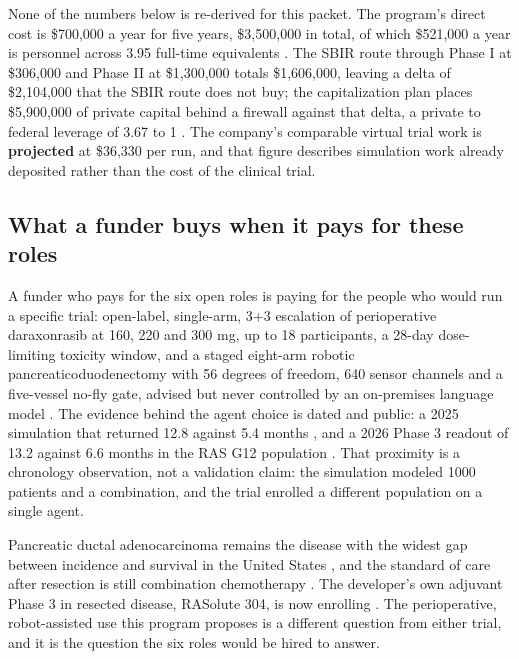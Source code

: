 None of the numbers below is re-derived for this packet. The program's direct
cost is \$700,000 a year for five years, \$3,500,000 in total, of which
\$521,000 a year is personnel across 3.95 full-time equivalents
\cite{movein2026}. The SBIR route through Phase I at \$306,000 and Phase II at
\$1,300,000 totals \$1,606,000, leaving a delta of \$2,104,000 that the SBIR
route does not buy; the capitalization plan places \$5,900,000 of private
capital behind a firewall against that delta, a private to federal leverage of
3.67 to 1 \cite{capitalplan2026}. The company's comparable virtual trial work is
\textbf{projected} at \$36,330 per run, and that figure describes simulation work
already deposited rather than the cost of the clinical trial.

\subsection{What a funder buys when it pays for these roles}

A funder who pays for the six open roles is paying for the people who would run
a specific trial: open-label, single-arm, 3+3 escalation of perioperative
daraxonrasib at 160, 220 and 300 mg, up to 18 participants, a 28-day
dose-limiting toxicity window, and a staged eight-arm robotic
pancreaticoduodenectomy with 56 degrees of freedom, 640 sensor channels and a
five-vessel no-fly gate, advised but never controlled by an on-premises language
model \cite{onpremwhippl,phase1ind}. The evidence behind the agent choice is
dated and public: a 2025 simulation that returned 12.8 against 5.4 months
\cite{qspmetpancre}, and a 2026 Phase 3 readout of 13.2 against 6.6 months in
the RAS G12 population \cite{rasolute302}. That proximity is a chronology
observation, not a validation claim: the simulation modeled 1000 patients and a
combination, and the trial enrolled a different population on a single agent.

Pancreatic ductal adenocarcinoma remains the disease with the widest gap between
incidence and survival in the United States \cite{siegel2025statistics}, and the
standard of care after resection is still combination chemotherapy
\cite{conroy2018folfirinox}. The developer's own adjuvant Phase 3 in resected
disease, RASolute 304, is now enrolling \cite{ctgov304}. The perioperative,
robot-assisted use this program proposes is a different question from either
trial, and it is the question the six roles would be hired to answer.
